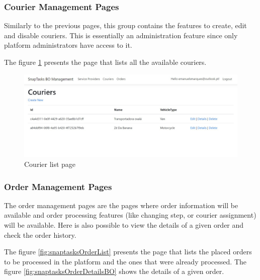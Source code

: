 \subsubsection{Courier Management Pages}
Similarly to the previous pages, this group contains the features to create, edit and disable couriers. This is essentially an administration feature since only platform administrators have access to it.
\par
The figure \ref{fig:snaptasksCourierList} presents the page that lists all the available couriers.

\begin{figure}[ht]
\centering
\includegraphics[width=\textwidth,keepaspectratio]{chapters/Implementation/assets/snaptasks-bo-listCouriers.jpg}
\caption[Courier list page]{Courier list page}
\label{fig:snaptasksCourierList}
\end{figure}


\subsubsection{Order Management Pages}

The order management pages are the pages where order information will be available and order processing features (like changing step, or courier assignment) will be available. Here is also possible to view the details of a given order and check the order history.

\par

The figure \ref{fig:snaptasksOrderList} presents the page that lists the placed orders to be processed in the platform and the ones that were already processed. The figure \ref{fig:snaptasksOrderDetailsBO} shows the details of a given order.

